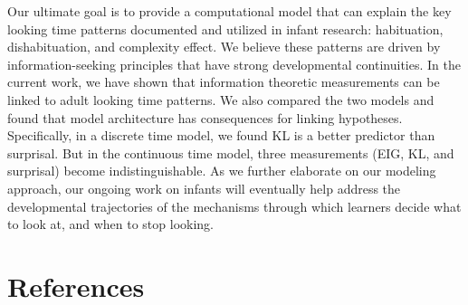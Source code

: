 \documentclass[10pt, letterpaper]{article}
\begin{document}
Our ultimate goal is to provide a computational model that can explain
the key looking time patterns documented and utilized in infant
research: habituation, dishabituation, and complexity effect. We believe
these patterns are driven by information-seeking principles that have
strong developmental continuities. In the current work, we have shown
that information theoretic measurements can be linked to adult looking
time patterns. We also compared the two models and found that model
architecture has consequences for linking hypotheses. Specifically, in a
discrete time model, we found KL is a better predictor than surprisal.
But in the continuous time model, three measurements (EIG, KL, and
surprisal) become indistinguishable. As we further elaborate on our
modeling approach, our ongoing work on infants will eventually help
address the developmental trajectories of the mechanisms through which
learners decide what to look at, and when to stop looking.

\hypertarget{references}{%
\section{References}\label{references}}

\setlength{\parindent}{-0.1in} 
\setlength{\leftskip}{0.125in}

\noindent
\end{document}
